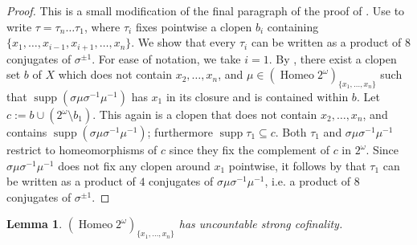 \documentclass[12pt,a4paper,reqno]{amsart}
\numberwithin{equation}{section}
\theoremstyle{plain}
\newtheorem{lem}[thm]{Lemma}
\theoremstyle{definition}
\DeclareMathOperator{\Homeo}{Homeo}
\DeclareMathOperator{\supp}{supp}
\begin{document}
\begin{proof}
This is a small modification of the final paragraph of the proof of \cite[Theorem 3.17]{Tr:IPG1}.
Use \cite[Lemma 3.16]{Tr:IPG1} to write $\tau=\tau_n\dots \tau_1$, where $\tau_i$  fixes pointwise a clopen $b_i$ containing 
$\{ x_1,\dots, x_{i-1},x_{i+1},\dots, x_n\}$.
We show that every $\tau_i$ can be written as a product of $8$ conjugates of $\sigma^{\pm 1}$. For ease of notation, we
take $i=1$.
By \cite[Lemma 3.15]{Tr:IPG1}, there exist a clopen set $b$ of $X$ which does not contain $x_2,\dots,x_n$, 
and $\mu\in(\Homeo 2^\omega)_{\{x_1,\dots,x_n\}}$ such that $\supp(\sigma\mu\sigma^{-1}\mu^{-1})$ has $x_1$ in its closure
 and is contained within $b$.
Let $c:=b\cup (2^\omega\setminus b_1)$. This again is a clopen that does not contain $x_2,\dots,x_n$, and contains
$\supp(\sigma\mu\sigma^{-1}\mu^{-1})$; furthermore $\supp\tau_1\subseteq c$.
Both 
$\tau_1$ and $\sigma\mu\sigma^{-1}\mu^{-1}$ restrict to homeomorphisms of $c$ since they fix the complement of $c$ in
$2^\omega$. Since $\sigma\mu\sigma^{-1}\mu^{-1}$ does not fix any clopen around $x_1$ pointwise, it follows by
\cite[Corollary 3.14]{Tr:IPG1} that $\tau_1$ can be written as a product of $4$ conjugates of $\sigma\mu\sigma^{-1}\mu^{-1}$,
i.e. a product of $8$ conjugates of $\sigma^{\pm 1}$.
\end{proof}




\begin{lem} \label{le:Xucsc}
  $(\Homeo 2^\omega)_{\{x_1,\dots,x_n\}}$ has uncountable strong cofinality.
\end{lem} 
\end{document}

